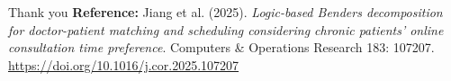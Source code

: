 \documentclass{beamer}
\begin{document}
\begin{frame}{Thank you}
  \textbf{Reference:} Jiang et al. (2025). \textit{Logic-based Benders decomposition for doctor-patient matching and scheduling considering chronic patients’ online consultation time preference}. Computers \& Operations Research 183: 107207. 
  \url{https://doi.org/10.1016/j.cor.2025.107207}
\end{frame}
\end{document}
